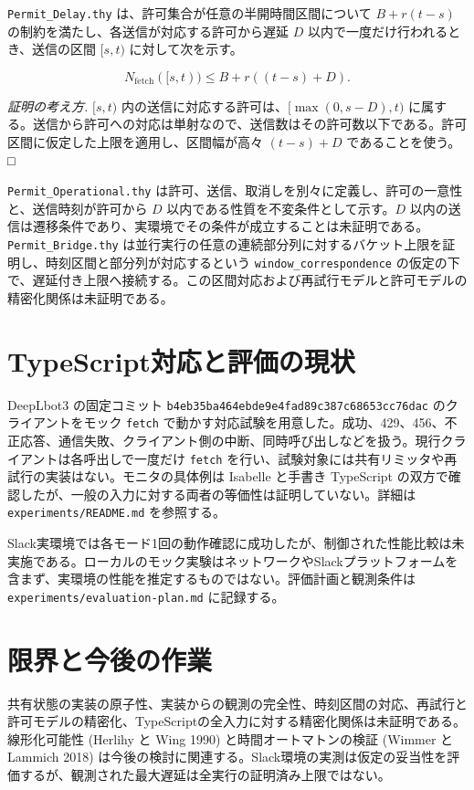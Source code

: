 \documentclass[
  japanese,
]{ltjsarticle}
\begin{document}
\texttt{Permit\_Delay.thy} は、許可集合が任意の半開時間区間について
\(B+r(t-s)\) の制約を満たし、各送信が対応する許可から遅延 \(D\)
以内で一度だけ行われるとき、送信の区間 \([s,t)\) に対して次を示す。

\[N_{\mathrm{fetch}}([s,t))\le B+r((t-s)+D).\]

\emph{証明の考え方.} \([s,t)\)
内の送信に対応する許可は、\([\max(0,s-D),t)\)
に属する。送信から許可への対応は単射なので、送信数はその許可数以下である。許可区間に仮定した上限を適用し、区間幅が高々
\((t-s)+D\) であることを使う。□

\texttt{Permit\_Operational.thy}
は許可、送信、取消しを別々に定義し、許可の一意性と、送信時刻が許可から
\(D\) 以内である性質を不変条件として示す。\(D\)
以内の送信は遷移条件であり、実環境でその条件が成立することは未証明である。\texttt{Permit\_Bridge.thy}
は並行実行の任意の連続部分列に対するバケット上限を証明し、時刻区間と部分列が対応するという
\texttt{window\_correspondence}
の仮定の下で、遅延付き上限へ接続する。この区間対応および再試行モデルと許可モデルの精密化関係は未証明である。

\section{TypeScript対応と評価の現状}\label{typescriptux5bfeux5fdcux3068ux8a55ux4fa1ux306eux73feux72b6}

DeepLbot3 の固定コミット
\texttt{b4eb35ba464ebde9e4fad89c387c68653cc76dac} のクライアントをモック
\texttt{fetch}
で動かす対応試験を用意した。成功、429、456、不正応答、通信失敗、クライアント側の中断、同時呼び出しなどを扱う。現行クライアントは各呼出しで一度だけ
\texttt{fetch}
を行い、試験対象には共有リミッタや再試行の実装はない。モニタの具体例は
Isabelle と手書き TypeScript
の双方で確認したが、一般の入力に対する両者の等価性は証明していない。詳細は
\texttt{experiments/README.md} を参照する。

Slack実環境では各モード1回の動作確認に成功したが、制御された性能比較は未実施である。ローカルのモック実験はネットワークやSlackプラットフォームを含まず、実環境の性能を推定するものではない。評価計画と観測条件は
\texttt{experiments/evaluation-plan.md} に記録する。

\section{限界と今後の作業}\label{ux9650ux754cux3068ux4ecaux5f8cux306eux4f5cux696d}

共有状態の実装の原子性、実装からの観測の完全性、時刻区間の対応、再試行と許可モデルの精密化、TypeScriptの全入力に対する精密化関係は未証明である。線形化可能性
(Herlihy と Wing 1990) と時間オートマトンの検証 (Wimmer と Lammich 2018)
は今後の検討に関連する。Slack環境の実測は仮定の妥当性を評価するが、観測された最大遅延は全実行の証明済み上限ではない。
\end{document}
